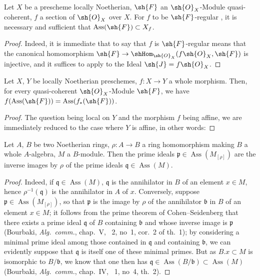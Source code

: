 \begin{corollary}[3.1.9]
\label{IV.3.1.9}
Let $X$ be a prescheme locally Noetherian, $\sh{F}$ an $\sh{O}_X$-Module quasi-coherent, $f$ a section of $\sh{O}_X$ over $X$.
For $f$ to be $\sh{F}$-regular , it is necessary and sufficient that $\operatorname{Ass}(\sh{F})\subset X_f$.
\end{corollary}

\begin{proof}
Indeed, it is immediate that to say that $f$ is $\sh{F}$-regular means that the canonical homomorphism $\sh{F}\to\shHom_{\sh{O}_X}(f\sh{O}_X,\sh{F})$ is injective, and it suffices to apply  to the Ideal $\sh{J}=f\sh{O}_X$.
\end{proof}

\begin{proposition}[3.1.10]
\label{IV.3.1.10}
Let $X$, $Y$ be locally Noetherian preschemes, $f:X\to Y$ a whole morphism.
Then, for every quasi-coherent $\sh{O}_X$-Module $\sh{F}$, we have $f(\operatorname{Ass}(\sh{F}))=\operatorname{Ass}(f_*(\sh{F}))$.
\end{proposition}

\begin{proof}
The question being local on $Y$ and the morphism $f$ being affine, we are immediately reduced to the case where $Y$ is affine, in other words:
\end{proof}


\begin{lemma}[3.1.10.1]
\label{IV.3.1.10.1}
Let $A$, $B$ be two Noetherian rings, $\rho:A\to B$ a ring homomorphism making $B$ a whole $A$-algebra, $M$ a $B$-module.
Then the prime ideals $\mathfrak{p}\in\operatorname{Ass}(M_{[\rho]})$ are the inverse images by $\rho$ of the prime ideals $\mathfrak{q}\in\operatorname{Ass}(M)$.
\end{lemma}

\begin{proof}
Indeed, if $\mathfrak{q}\in\operatorname{Ass}(M)$, $\mathfrak{q}$ is the annihilator in $B$ of an element $x\in M$, hence $\rho^{-1}(\mathfrak{q})$ is the annihilator in $A$ of $x$. Conversely, suppose $\mathfrak{p}\in\operatorname{Ass}(M_{[\rho]})$, so that $\mathfrak{p}$ is the image by $\rho$ of the annihilator $\mathfrak{b}$ in $B$ of an element $x\in M$; it follows from the prime theorem of Cohen--Seidenberg that there exists a prime ideal $\mathfrak{q}$ of $B$ containing $\mathfrak{b}$ and whose inverse image is $\mathfrak{p}$ (Bourbaki, \emph{Alg.\ comm.}, chap.~V, \textsection~2, no~1, cor.~2 of th.~1); by considering a minimal prime ideal among those contained in $\mathfrak{q}$ and containing $\mathfrak{b}$, we can evidently suppose that $\mathfrak{q}$ is itself one of these minimal primes. But as $B.x\subset M$ is isomorphic to $B/\mathfrak{b}$, we know that one then has $\mathfrak{q}\in\operatorname{Ass}(B/\mathfrak{b})\subset\operatorname{Ass}(M)$ (Bourbaki, \emph{Alg.\ comm.}, chap.~IV, \textsection~1, no~4, th.~2).
\end{proof}

